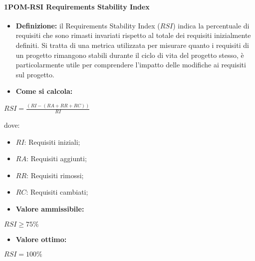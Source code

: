 \paragraph*{1POM-RSI Requirements Stability Index}
\begin{itemize}
    \item \textbf{Definizione:} il Requirements Stability Index ($RSI$) indica la percentuale di requisiti che sono rimasti invariati rispetto al totale dei requisiti inizialmente definiti. Si tratta di una metrica utilizzata per misurare quanto i requisiti di un progetto rimangono stabili durante il ciclo di vita del progetto stesso, è particolarmente utile per comprendere l’impatto delle modifiche ai requisiti sul progetto.
    \item \textbf{Come si calcola:}
\end{itemize}
\begin{center}
    $RSI = \frac{(RI-(RA + RR + RC))}{RI}$ 
 \end{center}
 dove:
 \begin{itemize}[label=$\rightarrow$]
     \item $RI$: Requisiti iniziali;
     \item $RA$: Requisiti aggiunti;
     \item $RR$: Requisiti rimossi;
     \item $RC$: Requisiti cambiati;
 \end{itemize}
\begin{itemize}
    \item \textbf{Valore ammissibile:}
\end{itemize}
\begin{center}
    $RSI \geq 75\%$
\end{center}
\begin{itemize}
    \item \textbf{Valore ottimo:}
\end{itemize}
\begin{center}
    $RSI = 100\%$
\end{center}
